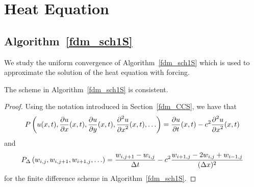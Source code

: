 \section{Heat Equation}

\subsection{Algorithm~\ref{fdm_sch1S}}

We study the uniform convergence of Algorithm~\ref{fdm_sch1S} which is
used to approximate the solution of the heat equation with forcing.

\begin{prop}
The scheme in Algorithm~\ref{fdm_sch1S} is consistent.
\end{prop}

\begin{proof}
Using the notation introduced in Section~\ref{fdm_CCS}, we have that
\[
P\left(u(x,t), \frac{\partial{u}}{\partial{x}}(x,t), \frac{\partial{u}}{\partial{y}}(x,t),
  \frac{\displaystyle \partial^{2}{u}} {\displaystyle \partial{x}^{2}}(x,t), \ldots \right)
= \frac{\partial{u}}{\partial{t}}(x,t) - c^2 \frac{\displaystyle \partial^{2}{u}} {\displaystyle \partial{x}^{2}}(x,t)
\]
and
\[
P_\Delta\left(w_{i,j}, w_{i,j+1}, w_{i+1,j}, \ldots\right)
= \frac{w_{i,j+1} - w_{i,j}}{\Delta{t}} - c^2 \frac{w_{i+1,j} - 2w_{i,j} +
  w_{i-1,j}}{(\Delta{x})^2}
\]
for the finite difference scheme in Algorithm~\ref{fdm_sch1S}.


\end{proof}

